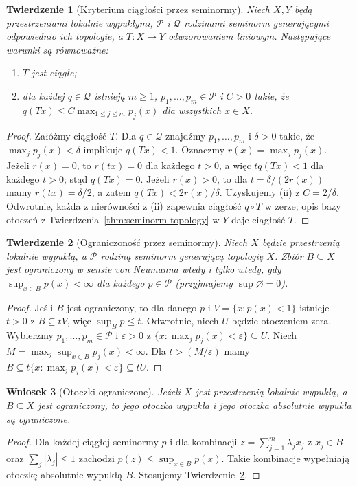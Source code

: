\documentclass[11pt,a4paper]{article}
\numberwithin{equation}{section}
\theoremstyle{plain}
\newtheorem{twierdzenie}{Twierdzenie}[section]
\newtheorem{wniosek}[twierdzenie]{Wniosek}
\theoremstyle{definition}
\theoremstyle{remark}
\begin{document}
\begin{twierdzenie}[Kryterium ciągłości przez seminormy]
\label{thm:continuous-sem}
Niech $X,Y$ będą przestrzeniami lokalnie wypukłymi,
$\mathcal P$ i $\mathcal Q$ rodzinami seminorm generującymi
odpowiednio ich topologie, a $T:X\to Y$ odwzorowaniem liniowym.
Następujące warunki są równoważne:
\begin{enumerate}[label=\textup{(\roman*)}]
\item $T$ jest ciągłe;
\item dla każdej $q\in\mathcal Q$ istnieją $m\ge1$,
$p_1,\ldots,p_m\in\mathcal P$ i $C>0$ takie, że
$q(Tx)\le C\max_{1\le j\le m}p_j(x)$ dla wszystkich $x\in X$.
\end{enumerate}
\end{twierdzenie}
\begin{proof}
Załóżmy ciągłość $T$. Dla $q\in\mathcal Q$
znajdźmy $p_1,\ldots,p_m$ i $\delta>0$ takie, że
$\max_jp_j(x)<\delta$ implikuje $q(Tx)<1$.
Oznaczmy $r(x)=\max_jp_j(x)$. Jeżeli $r(x)=0$,
to $r(tx)=0$ dla każdego $t>0$, a więc
$tq(Tx)<1$ dla każdego $t>0$; stąd $q(Tx)=0$.
Jeżeli $r(x)>0$, to dla
$t=\delta/(2r(x))$ mamy $r(tx)=\delta/2$,
a zatem $q(Tx)<2r(x)/\delta$. Uzyskujemy (ii)
z $C=2/\delta$. Odwrotnie, każda z nierówności
z (ii) zapewnia ciągłość $q\circ T$ w zerze;
opis bazy otoczeń z Twierdzenia~\ref{thm:seminorm-topology}
w $Y$ daje ciągłość $T$.
\end{proof}

\begin{twierdzenie}[Ograniczoność przez seminormy]
\label{thm:bounded-sem}
Niech $X$ będzie przestrzenią lokalnie wypukłą,
a $\mathcal P$ rodziną seminorm generującą topologię $X$.
Zbiór $B\subseteq X$ jest ograniczony w sensie von Neumanna
wtedy i tylko wtedy, gdy
$\sup_{x\in B}p(x)<\infty$ dla każdego $p\in\mathcal P$
(przyjmujemy $\sup\varnothing=0$).
\end{twierdzenie}
\begin{proof}
Jeśli $B$ jest ograniczony, to dla danego $p$ i
$V=\{x:p(x)<1\}$ istnieje $t>0$ z $B\subseteq tV$,
więc $\sup_Bp\le t$.
Odwrotnie, niech $U$ będzie otoczeniem zera.
Wybierzmy $p_1,\ldots,p_m\in\mathcal P$ i
$\varepsilon>0$ z
$\{x:\max_jp_j(x)<\varepsilon\}\subseteq U$.
Niech $M=\max_j\sup_{x\in B}p_j(x)<\infty$.
Dla $t>(M/\varepsilon)$ mamy
$B\subseteq t\{x:\max_jp_j(x)<\varepsilon\}\subseteq tU$.
\end{proof}

\begin{wniosek}[Otoczki ograniczone]
\label{cor:absconv-bounded}
Jeżeli $X$ jest przestrzenią lokalnie wypukłą,
a $B\subseteq X$ jest ograniczony, to jego otoczka wypukła
i jego otoczka absolutnie wypukła są ograniczone.
\end{wniosek}
\begin{proof}
Dla każdej ciągłej seminormy $p$ i dla kombinacji
$z=\sum_{j=1}^m\lambda_jx_j$ z $x_j\in B$ oraz
$\sum_j|\lambda_j|\le1$ zachodzi
$p(z)\le\sup_{x\in B}p(x)$. Takie kombinacje
wypełniają otoczkę absolutnie wypukłą $B$.
Stosujemy Twierdzenie~\ref{thm:bounded-sem}.
\end{proof}
\end{document}
